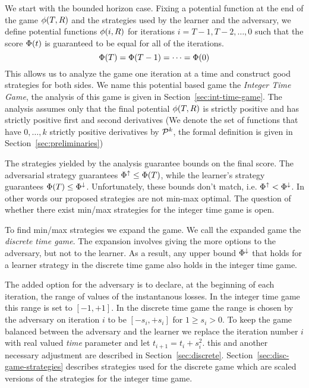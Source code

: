 \documentclass{article}[12pt]
\begin{document}
We start with the bounded horizon case. Fixing a potential function at
the end of the game $\phi(T,R)$ and the strategies used by the
learner and the adversary, we define potential functions $\phi(i,R)$
for iterations $i = T-1,T-2,\ldots,0$ such that the score $\Phi(t)$ is guaranteed to 
be equal for all of the iterations.
\[
  \Phi(T) = \Phi(T-1)=\cdots=\Phi(0)
\]
This allows us to analyze the game one iteration at a time and
construct good strategies for both sides. We name this potential based
game the {\em Integer Time Game}, the analysis of this game is given
in Section~\ref{sec:int-time-game}. The analysis assumes only that the
final potential $\phi(T,R)$ is strictly positive and has strictly positive
first and second derivatives (We denote the set
of functions that have $0,\ldots,k$ strictly positive derivatives by ${\cal P}^{k}$,
the formal definition is given in Section~\ref{sec:preliminaries})

The strategies yielded by the analysis guarantee bounds on the final
score. The adversarial strategy guarantees
$\Phi_{}^{\uparrow} \leq \Phi(T)$, while the learner's strategy
guarantees $\Phi(T) \leq \Phi_{}^{\downarrow}$. Unfortunately, these bounds
don't match, i.e. $\Phi_{}^{\uparrow}<\Phi_{}^{\downarrow}$. In other words our
proposed strategies are not min-max optimal. The question of whether
there exist min/max strategies for the integer time game is open.

To find min/max strategies we expand the game. We call the expanded
game the {\em discrete time game}. The expansion involves giving the
more options to the adversary, but not to the learner. As a result,
any upper bound $\Phi_{}^{\downarrow}$ that holds for a learner strategy in
the discrete time game also holds in the integer time game.

The added option for the adversary is to declare, at the beginning of
each iteration, the range of values of the instantanous losses. In the
integer time game this range is set to $[-1,+1]$. In the discrete time
game the range is chosen by the adversary on iteration $i$ to be
$[-s_i,+s_i]$ for $1\geq s_i >0$. To keep the game balanced between
the adversary and the learner we replace the iteration number $i$ with
real valued {\em time} parameter and let $t_{i+1}=t_i+s_i^2$. this and
another necessary adjustment are described in
Section~\ref{sec:discrete}. Section~\ref{sec:disc-game-strategies}
describes strategies used for the discrete game which are scaled
versions of the strategies for the integer time game.
\end{document}
